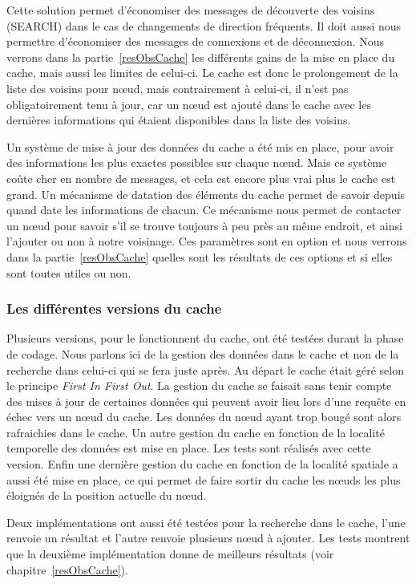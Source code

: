 \par Cette solution permet d'économiser des messages de découverte des voisins (SEARCH) dans le cas de changements de direction fréquents. Il doit aussi nous permettre d'économiser des messages de connexions et de déconnexion. Nous verrons dans la partie~\ref{resObsCache} les différents gains de la mise en place du cache, mais aussi les limites de celui-ci. Le cache est donc le prolongement de la liste des voisins pour nœud, mais contrairement à celui-ci, il n'est pas obligatoirement tenu à jour, car un nœud est ajouté dans le cache avec les dernières informations qui étaient disponibles dans la liste des voisins. 
\par Un système de mise à jour des données du cache a été mis en place, pour avoir des informations les plus exactes possibles sur chaque nœud. Mais ce système coûte cher en nombre de messages, et cela est encore plus vrai plus le cache est grand. Un mécanisme de datation des éléments du cache permet de savoir depuis quand date les informations de chacun. Ce mécanisme nous permet de contacter un nœud pour savoir s'il se trouve toujours à peu près au même endroit, et ainsi l'ajouter ou non à notre voisinage. Ces paramètres sont en option et nous verrons dans la partie~\ref{resObsCache} quelles sont les résultats de ces options et si elles sont toutes utiles ou non.

\subsubsection{Les différentes versions du cache}

Plusieurs versions, pour le fonctionnent du cache, ont été testées durant la phase de codage. Nous parlons ici de la gestion des données dans le cache et non de la recherche dans celui-ci qui se fera juste après. Au départ le cache était géré selon le principe \textit{First In First Out}. La gestion du cache se faisait sans tenir compte des mises à jour de certaines données qui peuvent avoir lieu lors d'une requête en échec vers un nœud du cache. Les données du nœud ayant trop bougé sont alors rafraichies dans le cache. Un autre gestion du cache en fonction de la localité temporelle des données est mise en place. Les tests sont réalisés avec cette version. Enfin une dernière gestion du cache en fonction de la localité spatiale a aussi été mise en place, ce qui permet de faire sortir du cache les nœuds les plus éloignés de la position actuelle du nœud.
\par Deux implémentations ont aussi été testées pour la recherche dans le cache, l'une renvoie un résultat et l'autre renvoie plusieurs nœud à ajouter. Les tests montrent que la deuxième implémentation donne de meilleurs résultats (voir chapitre~\ref{resObsCache}).


